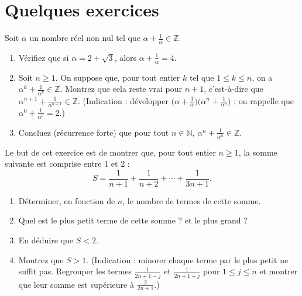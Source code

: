 \section*{Quelques exercices}
\begin{exercise} %
    Soit \(\alpha\) un nombre réel non nul tel que \(\alpha + \frac{1}{\alpha} \in \mathbb{Z}\).

    \begin{enumerate}
        \item Vérifiez que si \(\alpha = 2 + \sqrt{3}\), alors \(\alpha + \frac{1}{\alpha} = 4\).

        \item Soit \(n \geq 1\). On suppose que, pour tout entier \(k\) tel que \(1 \leq k \leq n\), on a \(\alpha^k + \frac{1}{\alpha^k} \in \mathbb{Z}\). Montrez que cela reste vrai pour \(n+1\), c'est-à-dire que \(\alpha^{n+1} + \frac{1}{\alpha^{n+1}} \in \mathbb{Z}\). (Indication : développer \(\bigl(\alpha + \frac{1}{\alpha}\bigr)\bigl(\alpha^n + \frac{1}{\alpha^n}\bigr)\) ; on rappelle que \(\alpha^0 + \frac{1}{\alpha^0} = 2\).)

        \item Concluez (récurrence forte) que pour tout \(n \in \mathbb{N}\), \(\alpha^n + \frac{1}{\alpha^n} \in \mathbb{Z}\).
    \end{enumerate}
\end{exercise}

\begin{exercise} %
    Le but de cet exercice est de montrer que, pour tout entier \(n \geq 1\), la somme suivante est comprise entre 1 et 2 :
    \[
    S = \frac{1}{n+1} + \frac{1}{n+2} + \cdots + \frac{1}{3n+1}.
    \]

    \begin{enumerate}
        \item Déterminer, en fonction de $n$, le nombre de termes de cette somme.
        \item Quel est le plus petit terme de cette somme ? et le plus grand ?
        \item En déduire que \(S < 2\).
        \item Montrez que \(S > 1\). (Indication : minorer chaque terme par le plus petit ne suffit pas. Regrouper les termes \(\frac{1}{2n+1-j}\) et \(\frac{1}{2n+1+j}\) pour \(1 \leq j \leq n\) et montrer que leur somme est supérieure à \(\frac{2}{2n+1}\).)
    \end{enumerate}
\end{exercise}

